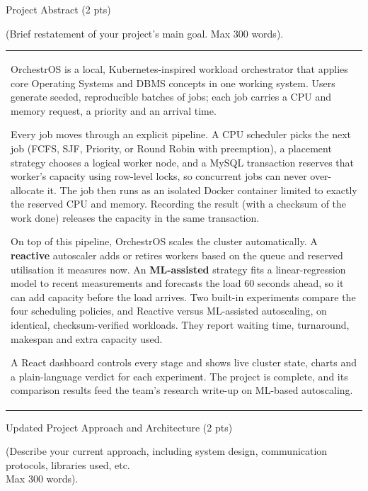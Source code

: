 \documentclass[12pt,a4paper]{article}
\newcommand{\sectiontitle}[1]{%
    {\color{GEUBlue}
    \fontsize{18}{22}\selectfont #1}
}
\newcommand{\instruction}[1]{%
    {\color{InstructionGrey}
    \fontsize{10.5}{13}\selectfont #1}
}
\newcommand{\answerbox}[2]{%
    \noindent
    \begin{tabularx}{\textwidth}{
        |>{\raggedright\arraybackslash}X|}
        \hline
        \parbox[t]{\dimexpr\linewidth-12pt\relax}{
            \vspace{5pt}
            \fontsize{10.5}{13}\selectfont #2
            \par\vspace{6pt}
        }\\
        \hline
    \end{tabularx}
}
\begin{document}
\vspace{0.70cm}

\sectiontitle{Project Abstract (2 pts)}

\vspace{0.05cm}
\instruction{(Brief restatement of your project's main goal. Max 300 words).}

\vspace{0.12cm}
\answerbox{3.60cm}{%
OrchestrOS is a local, Kubernetes-inspired workload orchestrator that applies core Operating Systems
and DBMS concepts in one working system. Users generate seeded, reproducible batches of jobs; each
job carries a CPU and memory request, a priority and an arrival time.

Every job moves through an explicit pipeline. A CPU scheduler picks the next job (FCFS, SJF, Priority,
or Round Robin with preemption), a placement strategy chooses a logical worker node, and a MySQL
transaction reserves that worker's capacity using row-level locks, so concurrent jobs can never
over-allocate it. The job then runs as an isolated Docker container limited to exactly the reserved CPU
and memory. Recording the result (with a checksum of the work done) releases the capacity in the same
transaction.

On top of this pipeline, OrchestrOS scales the cluster automatically. A \textbf{reactive} autoscaler adds
or retires workers based on the queue and reserved utilisation it measures now. An
\textbf{ML-assisted} strategy fits a linear-regression model to recent measurements and forecasts the
load 60 seconds ahead, so it can add capacity before the load arrives. Two built-in experiments compare
the four scheduling policies, and Reactive versus ML-assisted autoscaling, on identical,
checksum-verified workloads. They report waiting time, turnaround, makespan and extra capacity used.

A React dashboard controls every stage and shows live cluster state, charts and a plain-language
verdict for each experiment. The project is complete, and its comparison results feed the team's
research write-up on ML-based autoscaling.}

\vspace{0.70cm}

\sectiontitle{Updated Project Approach and Architecture (2 pts)}

\vspace{0.05cm}
\instruction{(Describe your current approach, including system design,
communication protocols, libraries used, etc.\\ Max 300 words).}
\end{document}
